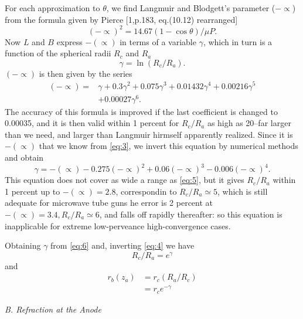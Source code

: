 \documentclass[10pt,a4paper,UTF8,fleqn]{article}
\begin{document}
For each approximation to $ \theta $, we find Langmuir and Blodgett's parameter ($ -\varpropto $) from the formula given by Pierce [1,p.183, eq.(10.12) rearranged]
\begin{equation} \label{eq:3}
	(-\varpropto)^2 = 14.67(1-\cos\theta)/\mu P.
\end{equation}
Now $ L $ and $ B $ express $ -(\varpropto) $ in terms of a variable $ \gamma $, which in turn is a function of the spherical radii $ R_c $ and $ R_a $
\begin{equation} \label{eq:4}
	\gamma = \ln(R_c/R_a).
\end{equation}
$ (-\varpropto) $ is then given by the series
\begin{equation} \label{eq:5}
	\begin{split}
	(-\varpropto) = &\gamma + 0.3\gamma^2 + 0.075\gamma^3 + 0.01432\gamma^4 + 0.00216\gamma^5 \\&+ 0.00027\gamma^6.
	\end{split}
\end{equation}
The accuracy of this formula is improved if the last coefficient is changed to 0.00035, and it is then valid within 1 percent for $ R_c/R_a$ as high as 20--far larger than we need, and larger than Langmuir hirmself apparently realized. Since it is $ -(\varpropto) $ that we know from \eqref{eq:3}, we invert this equation by numerical methods and obtain
\begin{equation} \label{eq:6}
	\gamma = -(\varpropto) - 0.275(-\varpropto)^2 + 0.06(-\varpropto)^3 - 0.006(-\varpropto)^4.
\end{equation}
This equation does not cover as wide a range as \eqref{eq:5}, but it gives $ R_c/R_a $ within 1 percent up to $ -(\varpropto) = 2.8 $, correspondin to $ R_c/R_a \simeq 5$, which is still adequate for microwave tube guns he error is 2 percent at $ -(\varpropto) = 3.4, R_c/R_a \simeq 6$, and falls off rapidly thereafter: so this equation is inapplicable for extreme low-perveance high-convergence cases.

Obtaining $ \gamma$ from \eqref{eq:6} and, inverting \eqref{eq:4} we have
\begin{equation} \label{eq:7}
	R_c/R_a = e^\gamma
\end{equation}
and
\begin{align} \label{eq:8}
	r_b(z_a) &= r_c(R_a/R_c)\nonumber \\ &= r_ce^{-\gamma}
\end{align}

\vspace{0.5ex}\textit{B. Refraction at the Anode}\vspace{0.5ex}
 
\end{document}
